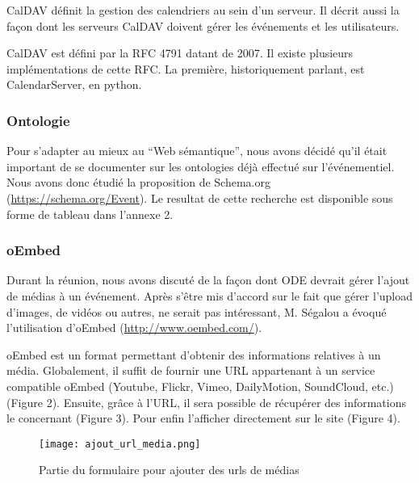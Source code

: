 CalDAV définit la gestion des calendriers au sein d'un serveur. Il décrit aussi la façon dont les serveurs CalDAV doivent gérer les événements et les utilisateurs.

CalDAV est défini par la RFC 4791 datant de 2007. Il existe plusieurs implémentations de cette RFC. La première, historiquement parlant, est CalendarServer, en python.

\subsubsection*{Ontologie}

Pour s'adapter au mieux au ``Web sémantique'', nous avons décidé qu'il était important de se documenter sur les ontologies déjà effectué sur l'événementiel. Nous avons donc étudié la proposition de Schema.org (\url{https://schema.org/Event}). Le resultat de cette recherche est disponible sous forme de tableau dans l'annexe 2.

\subsubsection*{oEmbed}

Durant la réunion, nous avons discuté de la façon dont ODE devrait gérer l'ajout de médias à un événement. Après s'être mis d'accord sur le fait que gérer l'upload d'images, de vidéos ou autres, ne serait pas intéressant, M. Ségalou a évoqué l'utilisation d'oEmbed (\url{http://www.oembed.com/}).

oEmbed est un format permettant d'obtenir des informations relatives à un média. Globalement, il suffit de fournir une URL appartenant à un service compatible oEmbed (Youtube, Flickr, Vimeo, DailyMotion, SoundCloud, etc.) (Figure 2). Ensuite, grâce à l'URL, il sera possible de récupérer des informations le concernant (Figure 3). Pour enfin l'afficher directement sur le site (Figure 4).

\newpage

\begin{figure}[H]
\begin{center}
\texttt{[image: ajout\_url\_media.png]}
\end{center}
\caption{Partie du formulaire pour ajouter des urls de médias}
\end{figure}


